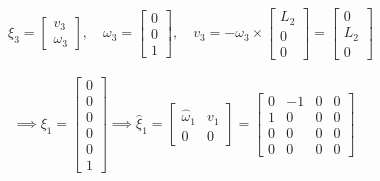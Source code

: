 \begin{align*}
    \quad
    \xi_{3}
    =
    \begin{bmatrix}
        v_3 \\
        \omega_3
    \end{bmatrix},
    \quad
    \omega_3
    =
    \begin{bmatrix}
        0 \\
        0 \\
        1
    \end{bmatrix},
    \quad
    v_3
    =
    - \omega_3 \times
    \begin{bmatrix}
        L_2 \\
        0   \\
        0
    \end{bmatrix}
    =
    \begin{bmatrix}
        0   \\
        L_2 \\
        0
    \end{bmatrix}
\end{align*}

\begin{equation*}
    \implies
    \xi_{1}
    =
    \begin{bmatrix}
        0 \\
        0 \\
        0 \\
        0 \\
        0 \\
        1
    \end{bmatrix}
    \implies
    \widehat{\xi}_{1}
    =
    \begin{bmatrix}
        \widehat{\omega}_{1} & v_1 \\
        0                    & 0
    \end{bmatrix}
    =
    \begin{bmatrix}
        0 & -1 & 0 & 0 \\
        1 & 0  & 0 & 0 \\
        0 & 0  & 0 & 0 \\
        0 & 0  & 0 & 0
    \end{bmatrix}
\end{equation*}


